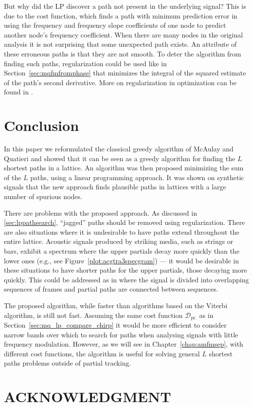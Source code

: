 \documentclass{article}
\begin{document}
\begin{sloppy}
But why did the LP discover a path not present in the underlying signal? This is
due to the cost function, which finds a path with minimum prediction error in
using the frequency and frequency slope coefficients of one node to predict
another node's frequency coefficient. When there are many nodes in the original
analysis it is not surprising that some unexpected path exists.  An attribute of
these erroneous paths is that they are not smooth. To deter the algorithm from
finding such paths, regularization could be used like in
Section~\ref{sec:mqfmfromphase} that minimizes the integral of the squared
estimate of the path's second derivative. More on regularization in optimization
can be found in \cite[ch.~6.3]{boyd2004convex}.

\section{Conclusion}

In this paper we reformulated the classical greedy algorithm of McAulay and
Quatieri and showed that it can be seen as a greedy algorithm for finding the $L$
shortest paths in a lattice. An algorithm was then proposed minimizing the sum
of the $L$ paths, using a linear programming approach. It was shown on synthetic
signals that the new approach finds plausible paths in lattices with a
large number of spurious nodes.

There are problems with the proposed approach. As discussed in
\ref{sec:lppathsearch}, ``jagged'' paths should be removed using regularization.
There are also situations where it is undesirable to have paths extend
throughout the entire lattice. Acoustic signals produced by striking media, such
as strings or bars, exhibit a spectrum where the upper partials decay more
quickly than the lower ones (e.g., see Figure~\ref{plot:acgtra3specgram}) --- it
would be desirable in these situations to have shorter paths for the upper
partials, those decaying more quickly. This could be addressed as in
\cite{depalle1993tracking} where the signal is divided into overlapping sequences of
frames and partial paths are connected between sequences.

The proposed algorithm, while faster than algorithms based on the Viterbi
algorithm, is still not fast. Assuming the same cost function
$\mathcal{D}_{\text{pr.}}$ as in Section~\ref{sec:mq_lp_compare_chirp} it would
be more efficient to consider narrow bands over which to search for paths when
analysing signals with little frequency modulation. However, as we will see in
Chapter~\ref{chap:amfmsep}, with different cost functions, the algorithm is
useful for solving general $L$ shortest paths problems outside of partial
tracking. 

\section{ACKNOWLEDGMENT}




\end{sloppy}
\end{document}
